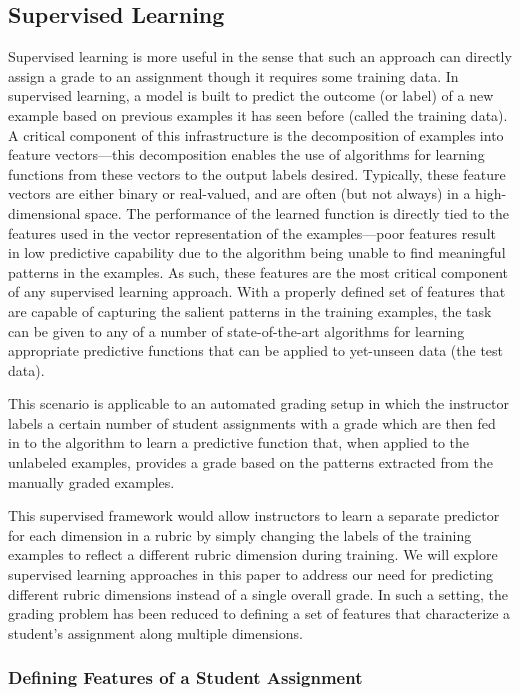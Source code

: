 \subsection{Supervised Learning}

Supervised learning is more useful in the sense that such an approach can directly 
assign a grade to an assignment though it requires some training data. In supervised learning, a model is built to predict the outcome (or label)
of a new example based on previous examples it has seen before (called the
training data). A critical component of this infrastructure is the
decomposition of examples into feature vectors---this decomposition enables
the use of algorithms for learning functions from these vectors to the
output labels desired. Typically, these feature vectors are either binary
or real-valued, and are often (but not always) in a high-dimensional space.
The performance of the learned function is directly tied to the features
used in the vector representation of the examples---poor features result
in low predictive capability due to the algorithm being unable to find
meaningful patterns in the examples. As such, these features are the most
critical component of any supervised learning approach. With a properly
defined set of features that are capable of capturing the salient patterns
in the training examples, the task can be given to any of a number of
state-of-the-art algorithms for learning appropriate predictive functions
that can be applied to yet-unseen data (the test data).

This scenario is applicable to an automated grading setup in which the
instructor labels a certain number of student assignments with a grade
which are then fed in to the algorithm to learn a predictive function that,
when applied to the unlabeled examples, provides a grade based on the
patterns extracted from the manually graded examples.

This supervised framework would allow instructors to learn a separate
predictor for each dimension in a rubric by simply changing the labels of
the training examples to reflect a different rubric dimension during
training. We will explore supervised learning approaches in this paper to
address our need for predicting different rubric dimensions instead of a
single overall grade. In such a setting, the grading problem has been
reduced to defining a set of features that characterize a student's
assignment along multiple dimensions.

\subsubsection{Defining Features of a Student Assignment}

